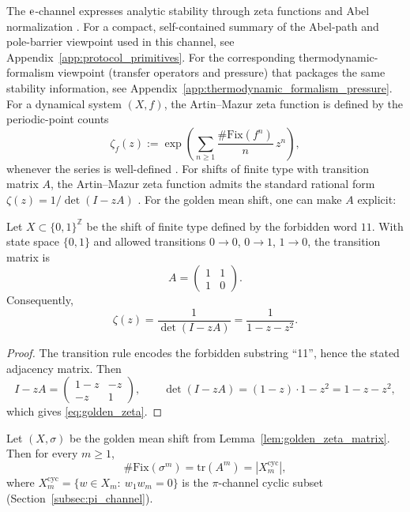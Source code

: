 The $\mathrm{e}$-channel expresses analytic stability through zeta functions and Abel normalization \cite{ArtinMazur1965,ParryPollicott1990,Ruelle1978}.
For a compact, self-contained summary of the Abel-path and pole-barrier viewpoint used in this channel, see Appendix~\ref{app:protocol_primitives}.
For the corresponding thermodynamic-formalism viewpoint (transfer operators and pressure) that packages the same stability information, see Appendix~\ref{app:thermodynamic_formalism_pressure}.
For a dynamical system $(X,f)$, the Artin--Mazur zeta function is defined by the periodic-point counts
\begin{equation}\label{eq:artin_mazur_def}
\zeta_f(z):=\exp\!\left(\sum_{n\ge 1}\frac{\#\mathrm{Fix}(f^n)}{n}\,z^n\right),
\end{equation}
whenever the series is well-defined \cite{ArtinMazur1965,ParryPollicott1990}.
For shifts of finite type with transition matrix $A$, the Artin--Mazur zeta function admits the standard rational form $\zeta(z)=1/\det(I-zA)$ \cite{ParryPollicott1990,LindMarcus1995,Ruelle1978}.
For the golden mean shift, one can make $A$ explicit:
\begin{lemma}\label{lem:golden_zeta_matrix}
Let $X\subset\{0,1\}^{\mathbb{Z}}$ be the shift of finite type defined by the forbidden word $11$.
With state space $\{0,1\}$ and allowed transitions $0\to 0$, $0\to 1$, $1\to 0$, the transition matrix is
\[
A=\begin{pmatrix}
1 & 1\\
1 & 0
\end{pmatrix}.
\]
Consequently,
\begin{equation}\label{eq:golden_zeta}
\zeta(z)=\frac{1}{\det(I-zA)}=\frac{1}{1-z-z^2}.
\end{equation}
\end{lemma}
\begin{proof}
The transition rule encodes the forbidden substring ``11'', hence the stated adjacency matrix.
Then
\[
I-zA=
\begin{pmatrix}
1-z & -z\\
-z & 1
\end{pmatrix},
\qquad
\det(I-zA)=(1-z)\cdot 1 - z^2=1-z-z^2,
\]
which gives \eqref{eq:golden_zeta}.
\end{proof}
%
\begin{lemma}\label{lem:cyc_periodic_points}
Let $(X,\sigma)$ be the golden mean shift from Lemma~\ref{lem:golden_zeta_matrix}.
Then for every $m\ge 1$,
\[
\#\mathrm{Fix}(\sigma^m)=\mathrm{tr}(A^m)=|X_m^{\mathrm{cyc}}|,
\]
where $X_m^{\mathrm{cyc}}=\{w\in X_m:\ w_1w_m=0\}$ is the $\pi$-channel cyclic subset (Section~\ref{subsec:pi_channel}).
\end{lemma}
